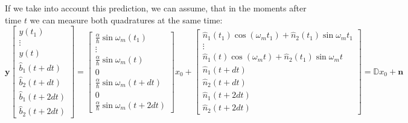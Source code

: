 If we take into account this prediction, we can assume, that in the moments after time $t$ we can measure both quadratures at the same time:
\begin{equation}
\mathbf{y}
\begin{bmatrix}
 y(t_1)\\\vdots\\ y(t) \\ \hat{b}_1(t+dt)\\ \hat{b}_2(t+dt)\\ \hat{b}_1(t+2dt)\\ \hat{b}_2(t+2dt)
\end{bmatrix}
=
\begin{bmatrix}
 \frac{\alpha}{\hbar} \sin \omega_m(t_1)\\ \vdots \\ \frac{\alpha}{\hbar} \sin \omega_m(t)\\ 0 \\ \frac{\alpha}{\hbar} \sin \omega_m(t+dt) \\ 0 \\ \frac{\alpha}{\hbar} \sin \omega_m(t+2dt)
\end{bmatrix}
x_0+
\begin{bmatrix}
 \hat{n}_1(t_1)\cos(\omega_mt_1) + \hat{n}_2(t_1)\sin{\omega_mt_1}\\
 \vdots\\
\hat{n}_1(t)\cos(\omega_mt) + \hat{n}_2(t_1)\sin{\omega_mt}\\
\hat{n}_1(t+dt) \\ \hat{n}_2(t+dt)\\ \hat{n}_1(t+2dt) \\ \hat{n}_2(t+2dt)
\end{bmatrix}
= \mathbb{D}x_0+\mathbf{n}
\end{equation}
